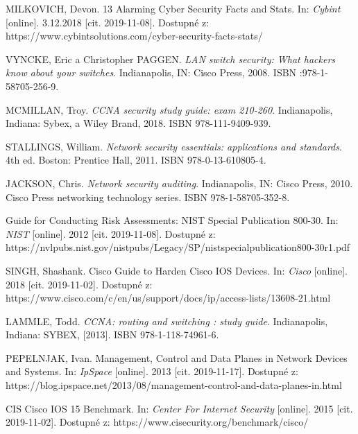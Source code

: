 

\begin{literatura}{99}
MILKOVICH, Devon. 13 Alarming Cyber Security Facts and Stats. In: \textit{Cybint} [online]. 3.12.2018 [cit. 2019-11-08]. Dostupné z: https://www.cybintsolutions.com/cyber-security-facts-stats/

VYNCKE, Eric a Christopher PAGGEN. \textit{LAN switch security: What hackers know about your switches}. Indianapolis, IN: Cisco Press, 2008. ISBN :978-1-58705-256-9.	
	
MCMILLAN, Troy. \textit{CCNA security study guide: exam 210-260}. Indianapolis, Indiana: Sybex, a Wiley Brand, 2018. ISBN 978-111-9409-939.
	
STALLINGS, William. \textit{Network security essentials: applications and standards}. 4th ed. Boston: Prentice Hall, 2011. ISBN 978-0-13-610805-4.

JACKSON, Chris. \textit{Network security auditing}. Indianapolis, IN: Cisco Press, 2010. Cisco Press networking technology series. ISBN 978-1-58705-352-8.

Guide for Conducting Risk Assessments: NIST Special Publication 800-30. In: \textit{NIST} [online]. 2012 [cit. 2019-11-08]. Dostupné z: https://nvlpubs.nist.gov/nistpubs/Legacy/SP/nistspecialpublication800-30r1.pdf

SINGH, Shashank. Cisco Guide to Harden Cisco IOS Devices. In: \textit{Cisco} [online]. 2018 [cit. 2019-11-02]. Dostupné z: https://www.cisco.com/c/en/us/support/docs/ip/access-lists/13608-21.html	

LAMMLE, Todd. \textit{CCNA: routing and switching : study guide}. Indianapolis,
Indiana: SYBEX, [2013]. ISBN 978-1-118-74961-6.
	
PEPELNJAK, Ivan. Management, Control and Data Planes in Network Devices and Systems. In: \textit{IpSpace} [online]. 2013 [cit. 2019-11-17]. Dostupné z: https://blog.ipspace.net/2013/08/management-control-and-data-planes-in.html

CIS Cisco IOS 15 Benchmark. In: \textit{Center For Internet Security} [online]. 2015 [cit. 2019-11-02]. Dostupné z: https://www.cisecurity.org/benchmark/cisco/


\end{literatura}
